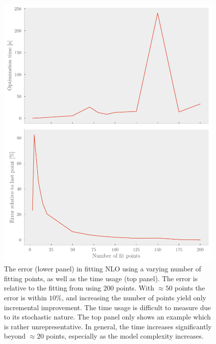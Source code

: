 \begin{figure}[pt]
  \centering
  \includegraphics{Figures/NLO_dependence_time_error.pdf}
  \caption{\label{fig:fitpoints} The error (lower panel) in fitting NLO using a varying number
  of fitting points, as well as the time usage (top panel). The error is
  relative to the fitting from using 200 points. With \(\approx 50\)
  points the error is within \(10\%\), and increasing the number of points yield
only incremental improvement. The time usage is difficult to measure due to its
stochastic nature. The top panel only shows an example which is rather
unrepresentative. In general, the time increases significantly beyond \(\approx
20\) points, especially as the model complexity increases.}
\end{figure}

